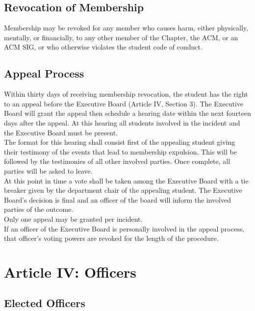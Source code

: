 \documentclass{article}
\begin{document}
\subsection{Revocation of Membership}

Membership may be revoked for any member who causes harm, either
physically, mentally, or financially, to any other member of the
Chapter, the ACM, or an ACM SIG, or who otherwise violates the student
code of conduct.

\subsection{Appeal Process}

Within thirty days of receiving membership revocation, the student has
the right to an appeal before the Executive Board (Article IV, Section
3). The Executive Board will grant the appeal then schedule a hearing
date within the next fourteen days after the appeal. At this hearing all
students involved in the incident and the Executive Board must be
present.\\

The format for this hearing shall consist first of the appealing student
giving their testimony of the events that lead to membership expulsion.
This will be followed by the testimonies of all other involved parties.
Once complete, all parties will be asked to leave.\\

At this point in time a vote shall be taken among the Executive Board
with a tie breaker given by the department chair of the appealing
student. The Executive Board's decision is final and an officer of the
board will inform the involved parties of the outcome.\\

Only one appeal may be granted per incident.\\

If an officer of the Executive Board is personally involved in the appeal
process, that officer's voting powers are revoked for the length of the
procedure.

\section{Article IV: Officers}

\subsection{Elected Officers}
\end{document}
